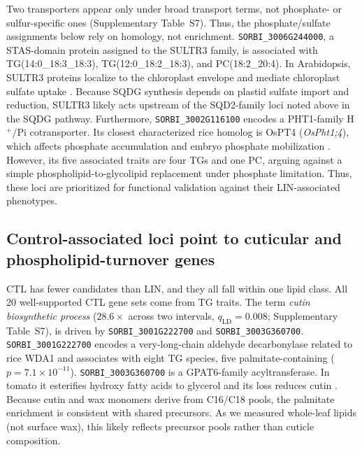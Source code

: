 \documentclass[9pt,twocolumn,twoside]{rilabRxiv}
\begin{document}
Two transporters appear only under broad transport terms, not phosphate- or sulfur-specific ones (Supplementary Table~S7). Thus, the phosphate/sulfate assignments below rely on homology, not enrichment. \texttt{SORBI\_3006G244000}, a STAS-domain protein assigned to the SULTR3 family, is associated with TG(14:0\_18:3\_18:3), TG(12:0\_18:2\_18:3), and PC(18:2\_20:4). In Arabidopsis, SULTR3 proteins localize to the chloroplast envelope and mediate chloroplast sulfate uptake \citep{Chen2019SULTR3}. Because SQDG synthesis depends on plastid sulfate import and reduction, SULTR3 likely acts upstream of the SQD2-family loci noted above in the SQDG pathway. Furthermore, \texttt{SORBI\_3002G116100} encodes a PHT1-family H$^+$/Pi cotransporter. Its closest characterized rice homolog is OsPT4 (\textit{OsPht1;4}), which affects phosphate accumulation and embryo phosphate mobilization \citep{Ye2015OsPT4,Zhang2015OsPht14}. However, its five associated traits are four TGs and one PC, arguing against a simple phospholipid-to-glycolipid replacement under phosphate limitation. Thus, these loci are prioritized for functional validation against their LIN-associated phenotypes.

\subsection*{Control-associated loci point to cuticular and phospholipid-turnover genes}

CTL has fewer candidates than LIN, and they all fall within one lipid class. All 20 well-supported CTL gene sets come from TG traits. The term \textit{cutin biosynthetic process} ($28.6\times$ across two intervals, $q_{\mathrm{LD}}=0.008$; Supplementary Table~S7), is driven by \texttt{SORBI\_3001G222700} and \texttt{SORBI\_3003G360700}. \texttt{SORBI\_3001G222700} encodes a very-long-chain aldehyde decarbonylase related to rice WDA1 \citep{Jung2006WDA1} and associates with eight TG species, five palmitate-containing ($p = 7.1\times10^{-11}$). \texttt{SORBI\_3003G360700} is a GPAT6-family acyltransferase. In tomato it esterifies hydroxy fatty acids to glycerol and its loss reduces cutin \citep{Petit2016GPAT6}. Because cutin and wax monomers derive from C16/C18 pools, the palmitate enrichment is consistent with shared precursors. As we measured whole-leaf lipids (not surface wax), this likely reflects precursor pools rather than cuticle composition.
\end{document}
